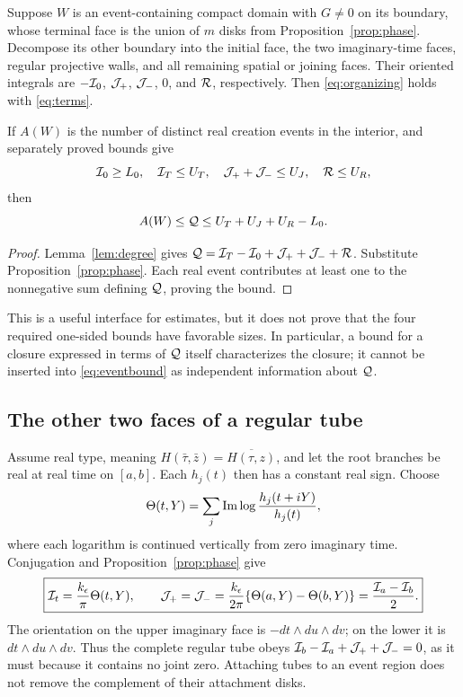 \begin{theorem}
\label{thm:transport}
Suppose $W$ is an event-containing compact domain with $G\ne0$ on
its boundary, whose terminal face is the union of $m$ disks from
Proposition~\ref{prop:phase}. Decompose its other boundary into the
initial face, the two imaginary-time faces, regular projective walls,
and all remaining spatial or joining faces. Their oriented integrals
are $-\mathcal I_0$, $\mathcal J_+$, $\mathcal J_-$, $0$, and $\mathcal R$, respectively.
Then \eqref{eq:organizing} holds with \eqref{eq:terms}.

If $A(W)$ is the number of distinct real creation events in the
interior, and separately proved bounds give
\[
 \mathcal I_0\ge L_0,\quad \mathcal I_T\le U_T,\quad
 \mathcal J_++\mathcal J_-\le U_J,\quad \mathcal R\le U_R,
\]
then
\begin{equation}
 A(W)\le\mathcal Q\le U_T+U_J+U_R-L_0.
 \label{eq:eventbound}
\end{equation}
\end{theorem}
\begin{proof}
Lemma~\ref{lem:degree} gives
$\mathcal Q=\mathcal I_T-\mathcal I_0+\mathcal J_++\mathcal J_-+\mathcal R$.
Substitute Proposition~\ref{prop:phase}. Each real event contributes
at least one to the nonnegative sum defining $\mathcal Q$, proving the bound.
\end{proof}

This is a useful interface for estimates, but it does not prove that
the four required one-sided bounds have favorable sizes. In
particular, a bound for a closure expressed in terms of $\mathcal Q$ itself
characterizes the closure; it cannot be inserted into
\eqref{eq:eventbound} as independent information about $\mathcal Q$.

\subsection{The other two faces of a regular tube}

Assume real type, meaning
$H(\bar\tau,\bar z)=\overline{H(\tau,z)}$, and let the root branches be real at real time on
$[a,b]$. Each $h_j(t)$ then has a constant real sign. Choose
\begin{equation}
 \Theta(t,Y)=\sum_j\operatorname{Im}\log\frac{h_j(t+iY)}{h_j(t)},
 \label{eq:Theta}
\end{equation}
where each logarithm is continued vertically from zero imaginary
time. Conjugation and Proposition~\ref{prop:phase} give
\begin{equation}
 \boxed{\displaystyle
 \mathcal I_t=\frac{k_\epsilon}{\pi}\Theta(t,Y),\qquad
 \mathcal J_+=\mathcal J_-=
 \frac{k_\epsilon}{2\pi}\{\Theta(a,Y)-\Theta(b,Y)\}
 =\frac{\mathcal I_a-\mathcal I_b}{2}.}
 \label{eq:closures}
\end{equation}
The orientation on the upper imaginary face is
$-dt\wedge du\wedge dv$; on the lower it is
$dt\wedge du\wedge dv$. Thus the complete regular tube obeys
$\mathcal I_b-\mathcal I_a+\mathcal J_++\mathcal J_-=0$, as it must because it contains
no joint zero. Attaching tubes to an event region does not remove
the complement of their attachment disks.
